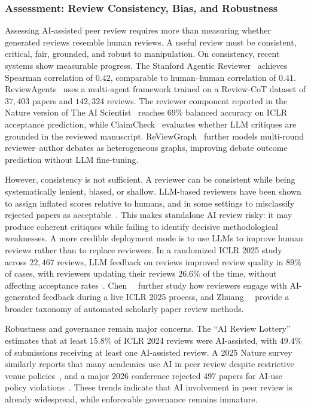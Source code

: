 \subsubsection{Assessment: Review Consistency, Bias, and Robustness}

\label{sec:review_quality}

Assessing AI-assisted peer review requires more than measuring whether generated reviews resemble human reviews. A useful review must be consistent, critical, fair, grounded, and robust to manipulation. On consistency, recent systems show measurable progress. The Stanford Agentic Reviewer~\cite{stanfordreviewer2025} achieves Spearman correlation of $0.42$, comparable to human--human correlation of $0.41$. ReviewAgents~\cite{reviewagents2025} uses a multi-agent framework trained on a Review-CoT dataset of $37{,}403$ papers and $142{,}324$ reviews. The reviewer component reported in the Nature version of The AI Scientist~\cite{aiscientistnature2026} reaches $69\%$ balanced accuracy on ICLR acceptance prediction, while ClaimCheck~\cite{claimcheck2025} evaluates whether LLM critiques are grounded in the reviewed manuscript. ReViewGraph~\cite{reviewgraph2025} further models multi-round reviewer--author debates as heterogeneous graphs, improving debate outcome prediction without LLM fine-tuning.

However, consistency is not sufficient. A reviewer can be consistent while being systematically lenient, biased, or shallow. LLM-based reviewers have been shown to assign inflated scores relative to humans, and in some settings to misclassify rejected papers as acceptable~\cite{llmreviewer2025}. This makes standalone AI review risky: it may produce coherent critiques while failing to identify decisive methodological weaknesses. A more credible deployment mode is to use LLMs to improve human reviews rather than to replace reviewers. In a randomized ICLR 2025 study across $22{,}467$ reviews, LLM feedback on reviews improved review quality in $89\%$ of cases, with reviewers updating their reviews $26.6\%$ of the time, without affecting acceptance rates~\cite{iclr2025reviewstudy}. Chen~\etal~\cite{reviewerfeedback2026} further study how reviewers engage with AI-generated feedback during a live ICLR 2025 process, and Zhuang~\etal~\cite{zhuang2025asprsurvey} provide a broader taxonomy of automated scholarly paper review methods.

Robustness and governance remain major concerns. The ``AI Review Lottery''~\cite{ailottery2024} estimates that at least $15.8\%$ of ICLR 2024 reviews were AI-assisted, with $49.4\%$ of submissions receiving at least one AI-assisted review. A 2025 Nature survey similarly reports that many academics use AI in peer review despite restrictive venue policies~\cite{aireviewsurvey2025}, and a major 2026 conference rejected $497$ papers for AI-use policy violations~\cite{aiuserejects2026}. These trends indicate that AI involvement in peer review is already widespread, while enforceable governance remains immature.

